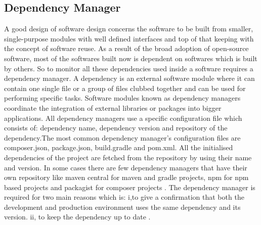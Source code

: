 \subsection{Dependency Manager}
A good design of software design concerns the software to be built from smaller, single-purpose modules with well defined interfaces and top of that keeping with the concept of software reuse. As a result of the broad adoption of open-source software, most of the softwares built now is dependent on softwares which is built by others. So to monitor all these dependencies used inside a software requires a dependency manager. A dependency is an external software module where it can contain one single file or a group of files clubbed together and can be used for performing specific tasks. Software modules known as dependency managers coordinate the integration of external libraries or packages into bigger applications. All dependency managers use a specific configuration file which consists of: dependency name, dependency version and repository of the dependency.The most common dependency manager’s configuration files are composer.json, package.json, build.gradle and pom.xml. All the initialised dependencies of the project are fetched from the repository by using their name and version. In some cases there are few dependency managers that have their own repository like maven central for maven and gradle projects, npm for npm based projects and packagist for composer projects \cite{Ma2017}. The dependency manager is required for two main reasons which is: i,to give a confirmation that both the development and production environment uses the same dependency and its version. ii, to keep the dependency up to date \cite{Dm2018}.
%

